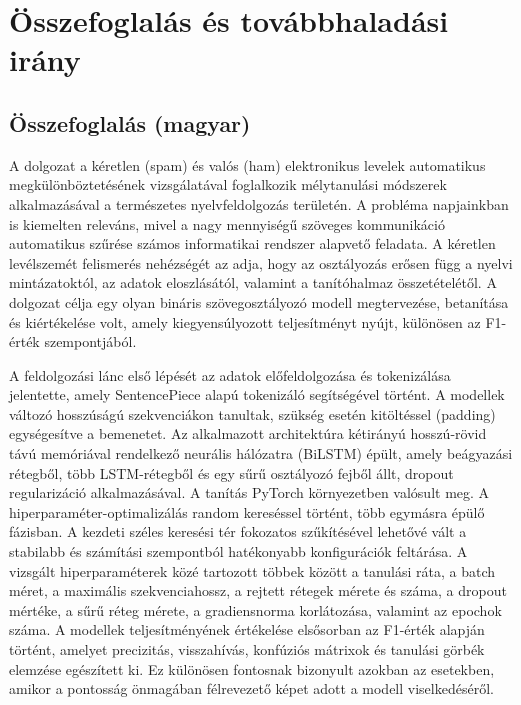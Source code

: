 \chapter{Összefoglalás és továbbhaladási irány}

\section{Összefoglalás (magyar)}

A dolgozat a kéretlen (spam) és valós (ham) elektronikus levelek automatikus megkülönböztetésének vizsgálatával foglalkozik mélytanulási módszerek alkalmazásával a természetes nyelvfeldolgozás területén. A probléma napjainkban is kiemelten releváns, mivel a nagy mennyiségű szöveges kommunikáció automatikus szűrése számos informatikai rendszer alapvető feladata. A kéretlen levélszemét felismerés nehézségét az adja, hogy az osztályozás erősen függ a nyelvi mintázatoktól, az adatok eloszlásától, valamint a tanítóhalmaz összetételétől. A dolgozat célja egy olyan bináris szövegosztályozó modell megtervezése, betanítása és kiértékelése volt, amely kiegyensúlyozott teljesítményt nyújt, különösen az F1-érték szempontjából.

A feldolgozási lánc első lépését az adatok előfeldolgozása és tokenizálása jelentette, amely SentencePiece alapú tokenizáló segítségével történt. A modellek változó hosszúságú szekvenciákon tanultak, szükség esetén kitöltéssel (padding) egységesítve a bemenetet. Az alkalmazott architektúra kétirányú hosszú-rövid távú memóriával rendelkező neurális hálózatra (BiLSTM) épült, amely beágyazási rétegből, több LSTM-rétegből és egy sűrű osztályozó fejből állt, dropout regularizáció alkalmazásával. A tanítás PyTorch környezetben valósult meg. A hiperparaméter-optimalizálás random kereséssel történt, több egymásra épülő fázisban. A kezdeti széles keresési tér fokozatos szűkítésével lehetővé vált a stabilabb és számítási szempontból hatékonyabb konfigurációk feltárása. A vizsgált hiperparaméterek közé tartozott többek között a tanulási ráta, a batch méret, a maximális szekvenciahossz, a rejtett rétegek mérete és száma, a dropout mértéke, a sűrű réteg mérete, a gradiensnorma korlátozása, valamint az epochok száma. A modellek teljesítményének értékelése elsősorban az F1-érték alapján történt, amelyet precizitás, visszahívás, konfúziós mátrixok és tanulási görbék elemzése egészített ki. Ez különösen fontosnak bizonyult azokban az esetekben, amikor a pontosság önmagában félrevezető képet adott a modell viselkedéséről.


